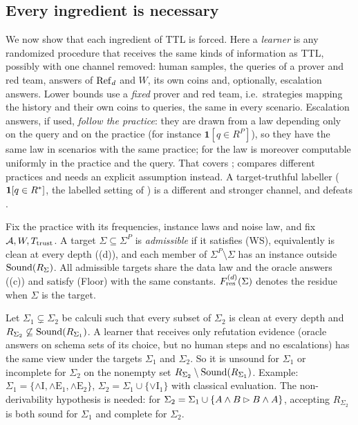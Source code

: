 \subsection{Every ingredient is necessary}\label{sec:twotier:lower}

We now show that each ingredient of TTL is forced. Here a \emph{learner} is any randomized procedure that receives the same kinds of information as TTL, possibly with one channel removed: human samples, the queries of a prover and red team, answers of $\mathrm{Ref}_d$ and $W$, its own coins and, optionally, escalation answers. Lower bounds use a \emph{fixed} prover and red team, i.e.\ strategies mapping the history and their own coins to queries, the same in every scenario. Escalation answers, if used, \emph{follow the practice}: they are drawn from a law depending only on the query and on the practice (for instance $\mathbf 1[q\in R^P]$), so they have the same law in scenarios with the same practice; for  the law is moreover computable uniformly in the practice and the query. That covers ;  compares different practices and needs an explicit assumption instead. A target-truthful labeller ($\mathbf 1[q\in R^{*}]$, the labelled setting of ) is a different and stronger channel, and defeats .

Fix the practice with its frequencies, instance laws and noise law, and fix $\mathcal{A},W,T_{\mathrm{trust}}$. A target $\Sigma\subseteq\Sigma^P$ is \emph{admissible} if it satisfies (WS), equivalently is clean at every depth ((d)), and each member of $\Sigma^P\setminus\Sigma$ has an instance outside $\mathrm{Sound}(R_\Sigma)$. All admissible targets share the data law and the oracle answers ((c)) and satisfy (Floor) with the same constants. $F^{(d)}_{\mathrm{res}}(\Sigma)$ denotes the residue when $\Sigma$ is the target.

\begin{proposition}\label{prop:twotier:positive}
Let $\Sigma_1\subsetneq\Sigma_2$ be calculi such that every subset of $\Sigma_2$ is clean at every depth and $R_{\Sigma_2}\not\subseteq\mathrm{Sound}(R_{\Sigma_1})$. A learner that receives only refutation evidence (oracle answers on schema sets of its choice, but no human steps and no escalations) has the same view under the targets $\Sigma_1$ and $\Sigma_2$. So it is unsound for $\Sigma_1$ or incomplete for $\Sigma_2$ on the nonempty set $R_{\Sigma_2}\setminus\mathrm{Sound}(R_{\Sigma_1})$. Example: $\Sigma_1=\{\wedge\mathrm I,\wedge\mathrm E_1,\wedge\mathrm E_2\}$, $\Sigma_2=\Sigma_1\cup\{\vee\mathrm I_1\}$ with classical evaluation. The non-derivability hypothesis is needed: for $\Sigma_2=\Sigma_1\cup\{A\wedge B\rhd B\wedge A\}$, accepting $R_{\Sigma_2}$ is both sound for $\Sigma_1$ and complete for $\Sigma_2$.
\end{proposition}

